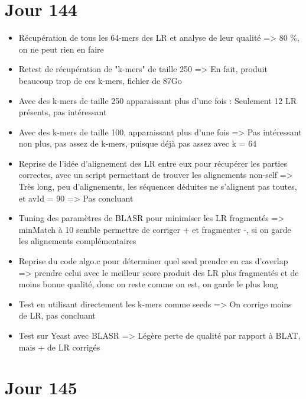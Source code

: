 \documentclass[12pt]{report}
\begin{document}
\section{Jour 144}

\begin{itemize}
	\item Récupération de tous les 64-mers des LR et analyse de leur qualité => 80 \%, on ne peut rien en faire
	
	\item Retest de récupération de "k-mers" de taille 250 => En fait, produit beaucoup trop de ces k-mers, fichier de 87Go
	
	\item Avec des k-mers de taille 250 apparaissant plus d'une fois : Seulement 12 LR présents, pas intéressant
	
	\item Avec des k-mers de taille 100, apparaissant plus d'une fois => Pas intéressant non plus, pas assez de k-mers,
		  puisque déjà pas assez avec k = 64
	
	\item Reprise de l'idée d'alignement des LR entre eux pour récupérer les parties correctes, avec un script permettant de trouver les
		  alignements non-self => Très long, peu d'alignements, les séquences déduites ne s'alignent pas toutes, et avId = 90 => Pas concluant
		  
	\item Tuning des paramètres de BLASR pour minimiser les LR fragmentés => minMatch à 10 semble permettre de corriger + et fragmenter -,
		  si on garde les alignements complémentaires
	
	\item Reprise du code algo.c pour déterminer quel seed prendre en cas d'overlap => prendre celui avec le meilleur score
		  produit des LR plus fragmentés et de moins bonne qualité, donc on reste comme on est, on garde le plus long
	
	\item Test en utilisant directement les k-mers comme seeds => On corrige moins de LR, pas concluant
	
	\item Test sur Yeast avec BLASR => Légère perte de qualité par rapport à BLAT, mais + de LR corrigés
\end{itemize}

\section{Jour 145}
\end{document}
